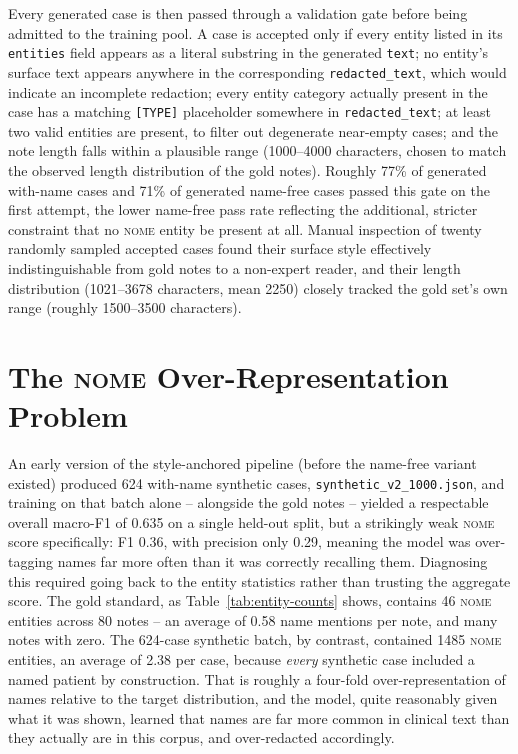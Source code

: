 \documentclass[12pt,a4paper]{report}
\newcommand{\NOME}{\textsc{nome}}
\begin{document}
Every generated case is then passed through a validation gate before being admitted to the training pool. A case is accepted only if every entity listed in its \texttt{entities} field appears as a literal substring in the generated \texttt{text}; no entity's surface text appears anywhere in the corresponding \texttt{redacted\_text}, which would indicate an incomplete redaction; every entity category actually present in the case has a matching \texttt{[TYPE]} placeholder somewhere in \texttt{redacted\_text}; at least two valid entities are present, to filter out degenerate near-empty cases; and the note length falls within a plausible range (1000--4000 characters, chosen to match the observed length distribution of the gold notes). Roughly 77\% of generated with-name cases and 71\% of generated name-free cases passed this gate on the first attempt, the lower name-free pass rate reflecting the additional, stricter constraint that no \NOME{} entity be present at all. Manual inspection of twenty randomly sampled accepted cases found their surface style effectively indistinguishable from gold notes to a non-expert reader, and their length distribution (1021--3678 characters, mean 2250) closely tracked the gold set's own range (roughly 1500--3500 characters).

\section{The \NOME{} Over-Representation Problem}
\label{sec:nome-overrep}

An early version of the style-anchored pipeline (before the name-free variant existed) produced 624 with-name synthetic cases, \texttt{synthetic\_v2\_1000.json}, and training on that batch alone -- alongside the gold notes -- yielded a respectable overall macro-F1 of 0.635 on a single held-out split, but a strikingly weak \NOME{} score specifically: F1 0.36, with precision only 0.29, meaning the model was over-tagging names far more often than it was correctly recalling them. Diagnosing this required going back to the entity statistics rather than trusting the aggregate score. The gold standard, as Table~\ref{tab:entity-counts} shows, contains 46 \NOME{} entities across 80 notes -- an average of 0.58 name mentions per note, and many notes with zero. The 624-case synthetic batch, by contrast, contained 1485 \NOME{} entities, an average of 2.38 per case, because \emph{every} synthetic case included a named patient by construction. That is roughly a four-fold over-representation of names relative to the target distribution, and the model, quite reasonably given what it was shown, learned that names are far more common in clinical text than they actually are in this corpus, and over-redacted accordingly.
\end{document}
